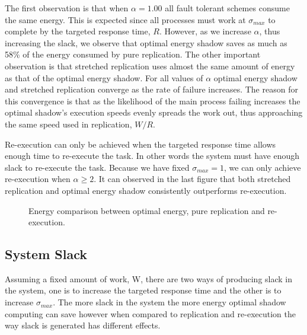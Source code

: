 The first observation is that when $\alpha=1.00$ all fault tolerant
schemes consume the same energy. This is expected since all processes
must work at $\sigma_{max}$ to complete by the targeted response time,
$R$. However, as we increase $\alpha$, thus increasing the slack, we
observe that optimal energy shadow saves as much as 58\% of the energy
consumed by pure replication. The other important observation is that
stretched replication uses almost the same amount of energy as that of
the optimal energy shadow. For all values of $\alpha$ optimal energy shadow
and stretched replication converge as the rate of failure
increases. The reason for this convergence is that as the likelihood
of the main process failing increases the optimal shadow’s execution
speeds evenly spreads the work out, thus approaching the same speed
used in replication, $W/R$.

Re-execution can only be achieved when the targeted response time
 allows enough time to re-execute the task. In other words the system
 must have enough slack to re-execute the task. Because we have fixed
 $\sigma_{max}=1$, we can only achieve re-execution when $\alpha \ge 2$. It can
 observed in the last figure that both stretched replication and
 optimal energy shadow consistently outperforms re-execution.


\begin{figure*}[hHtb]
\centering
{}
\caption { Energy comparison between optimal energy, pure replication and re-execution.}
\label{energy_savings_opt_replication_rexecution_grid}
\end{figure*}

\subsection{System Slack}

Assuming a fixed amount of work, W, there are two ways of producing
slack in the system, one is to increase the targeted response time and
the other is to increase $\sigma_{max}$. The more slack in the system
the more energy optimal shadow computing can save however when
compared to replication and re-execution the way slack is generated
has different effects.

